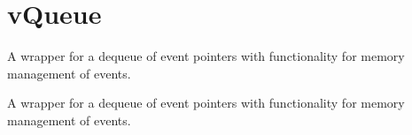 \hypertarget{group__vQueue}{\section{v\-Queue}
\label{group__vQueue}
}


A wrapper for a dequeue of event pointers with functionality for memory management of events.  


A wrapper for a dequeue of event pointers with functionality for memory management of events. 